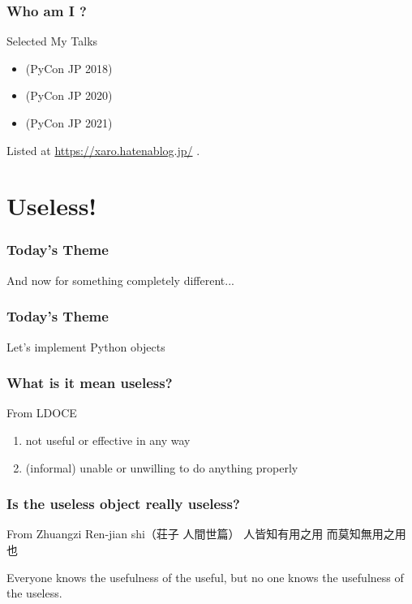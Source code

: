 \documentclass[aspectratio=169,dvipdfmx,14pt,notheorems]{beamer}
\theoremstyle{definition}
\begin{document}
\begin{frame}\frametitle{Who am I ?}

\begin{block}{Selected My Talks}
\begin{itemize}
\item {}(PyCon JP 2018)
\item {}(PyCon JP 2020)
\item {}(PyCon JP 2021)
\end{itemize}
\end{block}
Listed at \url{https://xaro.hatenablog.jp/} .
\end{frame}

\section{Useless!}

\begin{frame}\frametitle{Today's Theme}

\begin{center}
\Huge{And now for something completely different...}
\end{center}

\end{frame}

\begin{frame}\frametitle{Today's Theme}

\begin{center}
\Huge{Let's implement  Python objects}
\end{center}

\end{frame}

\begin{frame}\frametitle{What is it mean useless?}

\begin{block}{From LDOCE}
\begin{enumerate}
\item not useful or effective in any way
\item (informal) unable or unwilling to do anything properly
\end{enumerate}
\end{block}

\end{frame}

\begin{frame}\frametitle{Is the useless object really useless?}

\begin{block}{From Zhuangzi Ren-jian shi（荘子 人間世篇）}
人皆知有用之用 而莫知無用之用也
\end{block}
Everyone knows the usefulness of the useful, but no one knows the usefulness of the useless.

\end{frame}
\end{document}
